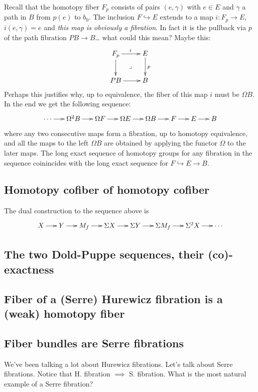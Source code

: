 Recall that the homotopy fiber $F_p$ consists
of pairs $(e,\gamma)$ with $e\in E$ and
$\gamma$ a path in $B$ from $p(e)$ to $b_0$.
The inclusion $F\hookrightarrow E$ extends to
a map $i:F_{p}\to E$, $i(e,\gamma)=e$ and
\textit{this map is obviously a fibration}.
In fact it is the pullback via $p$ of the
path fibration $PB\to B$… what could this
mean? Maybe this:
$$
\xymatrix{
	F_{p}\ar[r]^{i}\ar[d]\ar@{}[dr]|{\lrcorner}
	&E\ar[d]^{p}\\
	PB\ar[r]&B
}
$$
Perhaps this justifies why, up to
equivalence, the fiber of this map $i$ must
be $\Omega B$. In the end we get the
following sequence:
$$
\xymatrix@C=1.5em{
	\cdots\ar[r]&\Omega^{2}B\ar[r]&\Omega
	F\ar[r]
	&\Omega E\ar[r]&\Omega
	B\ar[r]&F\ar[r]&E\ar[r]&B
}
$$
where any two consecutive maps form a
fibration, up to homotopy equivalence, and
all the maps to the left $\Omega B$ are
obtained by applying the functor $\Omega$ to
the later maps. The long exact sequence of
homotopy groups for any fibration in the
sequence coinincides with the long exact
sequence for $F\hookrightarrow E\to B$.

\subsection{Homotopy cofiber of homotopy
cofiber}
\label{subsection-homot-cofib-homot-cofib}

The dual construction to the sequence above
is
$$
\xymatrix@C=1.5em{
	X\ar[r]&Y\ar[r]&M_{f}\ar[r]&\Sigma X\ar[r]
	&\Sigma Y\ar[r]&\Sigma
	M_{f}\ar[r]&\Sigma^{2}X\ar[r]
	&\cdots
}
$$

\subsection{The two Dold-Puppe sequences,
their (co)-exactness}
\label{subsection-two-dold-puppe-seque}

\subsection{Fiber of a (Serre) Hurewicz
fibration is a (weak) homotopy fiber}
\label{subsection-fiber-serre-hurew-fibra}

\subsection{Fiber bundles are Serre
fibrations}
\label{subsection-fiber-bundl-serre-fibra}
We've been talking a lot about Hurewicz
fibrations. Let's talk about Serre
fibrations. Notice that H. fibration
$\implies$ S. fibration. What is the most
natural example of a Serre fibration?

